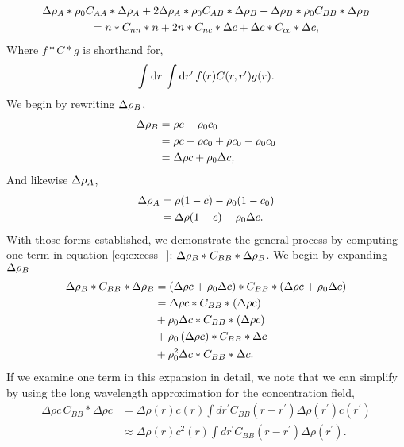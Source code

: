 %
\begin{gather}
    \label{eq:excess_}
      \Delta \rho_A \ast \rho_0 C_{AA} \ast \Delta \rho_A 
    + 2 \Delta \rho_A \ast \rho_0 C_{AB} \ast \Delta \rho_B 
    + \Delta \rho_B \ast \rho_0 C_{BB} \ast \Delta \rho_B \\ \nonumber
    =     n \ast C_{nn} \ast n 
        + 2 n \ast C_{nc} \ast \Delta c 
        + \Delta c \ast C_{cc} \ast \Delta c,
\end{gather}
%
Where $f \ast C \ast g$ is shorthand for,
%
\begin{equation}
    \int \mathrm{d}r\, \int \mathrm{d}r^\prime\, f(r) C(r, r^\prime) g(r).
\end{equation}
%
We begin by rewriting $\Delta \rho_B$,
%
\begin{align*}
  \Delta \rho_B &= \rho c - \rho_0 c_0 \\
        &= \rho c - \rho c_0 + \rho c_0 - \rho_0 c_0 \\
        &= \Delta \rho c + \rho_0 \Delta c,
\end{align*}
%
And likewise $\Delta \rho_A$,
%
\begin{align*}
  \Delta \rho_A &= \rho (1 - c) - \rho_0 (1 - c_0) \\
        &= \Delta \rho (1 - c) - \rho_0 \Delta c.
\end{align*}
%
With those forms established, we demonstrate the general process by computing one
term in equation \ref{eq:excess_}: $\Delta \rho_B \ast C_{BB} \ast \Delta \rho_B$. We
begin by expanding $\Delta \rho_B$
%
\begin{align}
    \label{this}
    \Delta \rho_B \ast C_{BB} \ast \Delta \rho_B &= 
        \left( \Delta \rho c + \rho_0 \Delta c \right)
        \ast C_{BB} \ast 
        \left(\Delta \rho c + \rho_0 \Delta c\right) \nonumber\\
                          &= \Delta \rho c \ast C_{BB} \ast \left( \Delta \rho c\right) \nonumber\\
                          &+ \rho_0 \Delta c \ast C_{BB} \ast \left( \Delta \rho c \right) \\
                          &+ \rho_0 \left(\Delta \rho c\right) \ast C_{BB} \ast \Delta c \nonumber\\
                          &+ \rho_0^2 \Delta c \ast C_{BB} \ast \Delta c. \nonumber
\end{align}
%
If we examine one term in this expansion in detail, we note that we can
simplify by using the long wavelength approximation for the concentration
field,
%
\begin{align}
  \Delta \rho c \, C_{BB} \ast \Delta \rho c &= \Delta \rho(r) c(r) \int dr^\prime C_{BB}(r - r^\prime) \Delta \rho(r^\prime) c(r^\prime) \nonumber \\
                                     &\approx \Delta \rho(r) c^2(r) \int dr^\prime C_{BB}(r - r^\prime) \Delta \rho(r^\prime).
\end{align}
